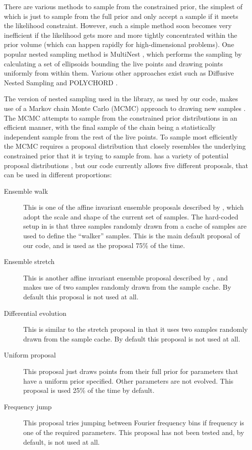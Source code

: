 There are various methods to sample from the constrained prior, the simplest of which is just to sample from the full
prior and only accept a sample if it meets the likelihood constraint. However, such a simple method soon becomes very
inefficient if the likelihood gets more and more tightly concentrated within the prior volume (which can happen rapidly
for high-dimensional problems). One popular nested sampling method is MultiNest \citep{2009MNRAS.398.1601F}, which performs
the sampling by calculating a set of ellipsoids bounding the live points and drawing points uniformly from within them.
Various other approaches exist such as Diffusive Nested Sampling \citep{Brewer2011,2016arXiv160603757B} and POLYCHORD \citep{2015MNRAS.450L..61H}.

The version of nested sampling used in the \lalinf library, as used by our code, makes use of a Markov chain Monte Carlo (MCMC) approach to
drawing new samples \citep{Veitch:2010}. The MCMC attempts to sample from the constrained prior distributions in an efficient manner, with
the final sample of the chain being a statistically independent sample from the rest of the live points. To sample most efficiently
the MCMC requires a proposal distribution that closely resembles the underlying constrained prior that it is trying to sample from.
\lalinf has a variety of potential proposal distributions \citep{2015PhRvD..91d2003V}, but our code currently allows five different
proposals, that can be used in different proportions:
\begin{description}
 \item[Ensemble walk] This is one of the affine invariant ensemble proposals described by \citet{GoodmanWeare}, which adopt the
 scale and shape of the current set of samples. The hard-coded setup in \lalinf is that three samples randomly drawn from a cache
 of samples are used to define the ``walker'' samples. This is the main default proposal of our code, and is used as the proposal
 75\% of the time.
 \item[Ensemble stretch] This is another affine invariant ensemble proposal described by \citet{GoodmanWeare}, and makes use of
 two samples randomly drawn from the sample cache. By default this proposal is not used at all.
 \item[Differential evolution] This is similar to the stretch proposal in that it uses two samples randomly drawn from the sample
 cache. By default this proposal is not used at all.
 \item[Uniform proposal] This proposal just draws points from their full prior for parameters that have a uniform prior specified.
 Other parameters are not evolved. This proposal is used 25\% of the time by default.
 \item[Frequency jump] This proposal tries jumping between Fourier frequency bins if frequency is one of the required parameters.
 This proposal has not been tested and, by default, is not used at all.
\end{description}
